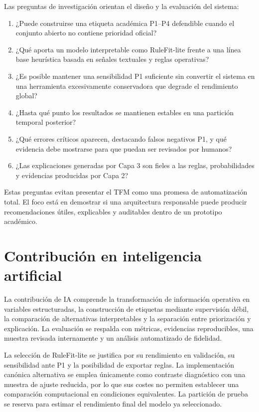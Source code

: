 Las preguntas de investigación orientan el diseño y la evaluación del sistema:

\begin{enumerate}
    \item[PI1.] ¿Puede construirse una etiqueta académica P1--P4 defendible cuando el conjunto abierto no contiene prioridad oficial?
    \item[PI2.] ¿Qué aporta un modelo interpretable como RuleFit-lite frente a una línea base heurística basada en señales textuales y reglas operativas?
    \item[PI3.] ¿Es posible mantener una sensibilidad P1 suficiente sin convertir el sistema en una herramienta excesivamente conservadora que degrade el rendimiento global?
    \item[PI4.] ¿Hasta qué punto los resultados se mantienen estables en una partición temporal posterior?
    \item[PI5.] ¿Qué errores críticos aparecen, destacando falsos negativos P1, y qué evidencia debe mostrarse para que puedan ser revisados por humanos?
    \item[PI6.] ¿Las explicaciones generadas por Capa 3 son fieles a las reglas, probabilidades y evidencias producidas por Capa 2?
\end{enumerate}

Estas preguntas evitan presentar el TFM como una promesa de automatización total. El foco está en demostrar si una arquitectura responsable puede producir recomendaciones útiles, explicables y auditables dentro de un prototipo académico.

\section{Contribución en inteligencia artificial}

La contribución de IA comprende la transformación de información operativa en
variables estructuradas, la construcción de etiquetas mediante supervisión débil,
la comparación de alternativas interpretables y la separación entre priorización y
explicación. La evaluación se respalda con métricas, evidencias reproducibles, una
muestra revisada internamente y un análisis automatizado de fidelidad.

La selección de RuleFit-lite se justifica por su rendimiento en validación, su sensibilidad ante P1 y la posibilidad de exportar reglas. La implementación canónica alternativa se emplea únicamente como contraste diagnóstico con una muestra de ajuste reducida, por lo que sus costes no permiten establecer una comparación computacional en condiciones equivalentes. La partición de prueba se reserva para estimar el rendimiento final del modelo ya seleccionado.

